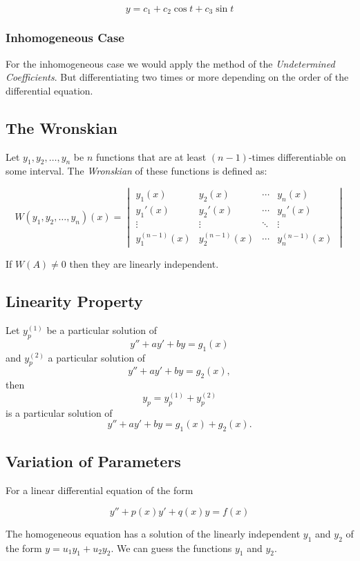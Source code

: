 \[y = c_1 + c_2 \cos t + c_3 \sin t\]

\subsubsection{Inhomogeneous Case}

For the inhomogeneous case we would apply the method of the \emph{Undetermined Coefficients}. But 
differentiating two times or more depending on the order of the differential equation.

\subsection{The Wronskian}

Let \( y_1, y_2, \ldots, y_n \) be \( n \) functions that are at least 
\( (n-1) \)-times differentiable on some interval. The \emph{Wronskian} of these 
functions is defined as:

\[
W(y_1, y_2, \ldots, y_n)(x) =
\begin{vmatrix}
y_1(x) & y_2(x) & \cdots & y_n(x) \\
y_1'(x) & y_2'(x) & \cdots & y_n'(x) \\
\vdots & \vdots & \ddots & \vdots \\
y_1^{(n-1)}(x) & y_2^{(n-1)}(x) & \cdots & y_n^{(n-1)}(x)
\end{vmatrix}
\]

If \(W(A) \ne 0\) then they are linearly independent.


\subsection{Linearity Property}

Let \( y_p^{(1)} \) be a particular solution of  
\[
y'' + ay' + by = g_1(x)
\]  
and \( y_p^{(2)} \) a particular solution of  
\[
y'' + ay' + by = g_2(x),
\]  
then  
\[
y_p = y_p^{(1)} + y_p^{(2)}
\]  
is a particular solution of  
\[
y'' + ay' + by = g_1(x) + g_2(x).
\]  

\subsection{Variation of Parameters}

For a linear differential equation of the form

\[
y'' + p(x)y' + q(x)y = f(x)
\]

The homogeneous equation has a solution of the linearly independent \(y_1\) and \(y_2\)
of the form \(y = u_1 y_1 + u_2 y_2\). We can guess the functions \(y_1\) and \(y_2\).
\vspace{\baselineskip}

